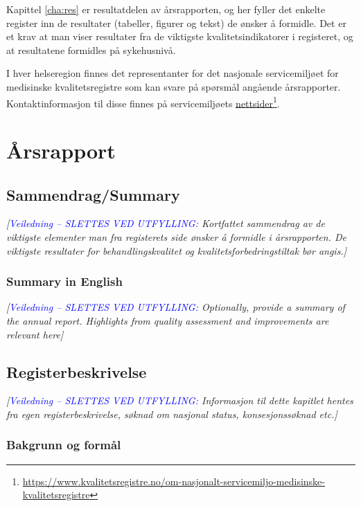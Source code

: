 \documentclass[norsk, a4paper, twocolumn]{report}
\newcommand{\newtext}[1]{\cbstart\textcolor{blue}{#1\cbend}}
\newcommand{\guide}[1] {
	\textit{[\textcolor{guidegray}{\newtext{Veiledning -- SLETTES VED UTFYLLING:} #1}]}
	}
\begin{document}
Kapittel \ref{cha:res} er resultatdelen av årsrapporten, og her fyller det
enkelte register inn de resultater (tabeller, figurer og tekst) de ønsker å
formidle. Det er et krav at man viser resultater fra de viktigste
kvalitetsindikatorer i registeret, og at resultatene formidles på
sykehusnivå.

I hver helseregion finnes det representanter for det nasjonale
servicemiljøet for medisinske kvalitetsregistre som kan svare på spørsmål
angående årsrapporter. Kontaktinformasjon til disse finnes på
servicemiljøets \href{https://www.kvalitetsregistre.no/om-nasjonalt-servicemiljo-medisinske-kvalitetsregistre}{nettsider}\footnote{\url{https://www.kvalitetsregistre.no/om-nasjonalt-servicemiljo-medisinske-kvalitetsregistre}}.




\tableofcontents




\part{Årsrapport}\label{par:rap}
\thispagestyle{empty}
\twocolumn



\chapter{Sammendrag/Summary}
\guide{Kortfattet sammendrag av de viktigste elementer man fra registerets side
ønsker å formidle i årsrapporten. De viktigste resultater for
behandlingskvalitet og kvalitetsforbedringstiltak bør angis.}

\section*{Summary in English}
\guide{Optionally, provide a summary of the annual report. Highlights from
quality assessment and improvements are relevant here}


\chapter{Registerbeskrivelse}\label{cha:reg}
\guide{Informasjon til dette kapitlet hentes fra egen registerbeskrivelse,
søknad om nasjonal status, konsesjonssøknad etc.}

\section{Bakgrunn og formål}
\end{document}
